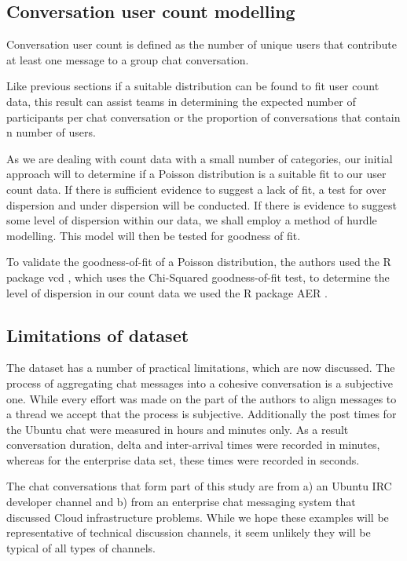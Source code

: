 \subsection{Conversation user count modelling}

Conversation user count is defined as the number of unique users that contribute at least one message to a group chat conversation. 

Like previous sections if a suitable distribution can be found to fit user count data, this result can assist teams in determining the expected number of participants per chat conversation or the proportion of conversations that contain n number of users.  

As we are dealing with count data with a small number of categories, our initial approach will to determine if a Poisson distribution is a suitable fit to our user count data. If there is sufficient evidence to suggest a lack of fit, a test for over dispersion and under dispersion will be conducted. If there is evidence to suggest some level of dispersion within our data, we shall employ a method of hurdle modelling. This model will then be tested for goodness of fit.

To validate the goodness-of-fit of a Poisson distribution, the authors used the R package vcd \cite{Rvcd}, which uses the Chi-Squared goodness-of-fit test, to determine the level of dispersion in our count data we used the R package AER \cite{RAER}.

\subsection{Limitations of dataset}

The dataset has a number of practical limitations, which are now discussed. The process of aggregating chat messages into a cohesive conversation is a subjective one. While every effort was made on the part of the authors to align messages to a thread we accept that the process is subjective. Additionally the post times for the Ubuntu chat were measured in hours and minutes only. As a result conversation duration, delta and inter-arrival times were recorded in minutes, whereas for the enterprise data set, these times were recorded in seconds. \par

The chat conversations that form part of this study are from a) an Ubuntu IRC developer channel and b) from an enterprise chat messaging system that discussed Cloud infrastructure problems. While we hope these examples will be representative of technical discussion channels, it seem unlikely they will be typical of all types of channels. \par

